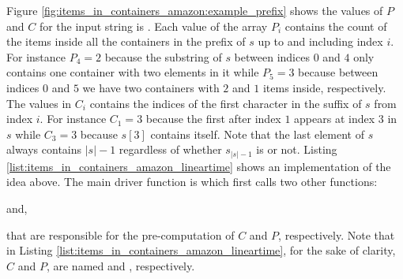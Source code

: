 Figure \ref{fig:items_in_containers_amazon:example_prefix} shows the values of $P$ and $C$ for the input string is .
Each value of the array $P_i$ contains the count of the items inside all the containers in the prefix of $s$ up to and including index $i$. 
For instance $P_4=2$ because the substring of $s$ between indices $0$ and $4$ only contains one container with two elements in it while $P_5=3$ because
between indices $0$ and $5$ we have two containers with $2$ and $1$ items inside, respectively.
The values in $C_i$ contains the indices of the first character  in the suffix of $s$ from index $i$.
For instance $C_1=3$ because the first  after index $1$ appears at index $3$ in $s$ while
$C_3=3$ because $s[3]$ contains  itself.
Note that the last element of $s$ always contains $|s|-1$ regardless of whether $s_{|s|-1}$ is  or not. 
Listing \ref{list:items_in_containers_amazon_lineartime} shows an implementation of the idea above. 
The main driver function is  which first calls two other functions:
\begin{enumerate*}
	\item {} and,
	\item {}
\end{enumerate*}
that are responsible for the pre-computation of $C$ and $P$, respectively.
Note that in Listing \ref{list:items_in_containers_amazon_lineartime}, 
for the sake of clarity, $C$ and $P$, are named  and , respectively.

